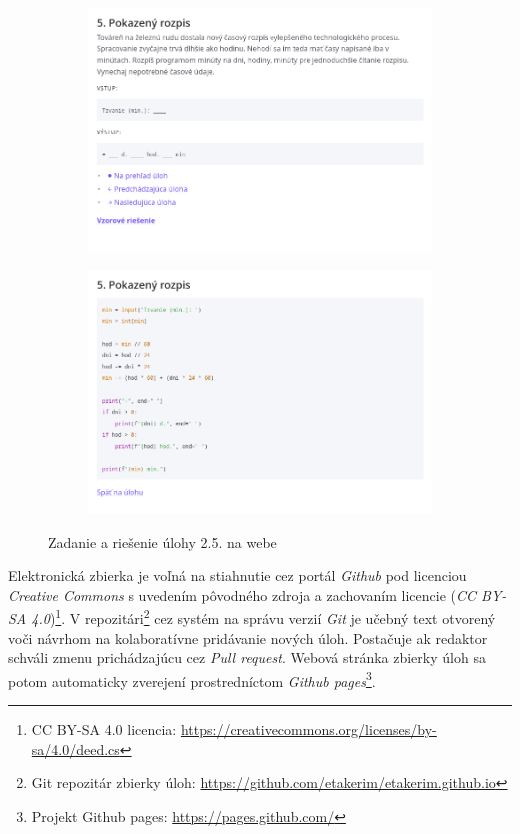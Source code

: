 \begin{figure}[h]
\centering
\begin{subfigure}[b]{0.49\textwidth}
\centering
\includegraphics[width=\textwidth]{assets/web-uloha.png}
\end{subfigure}
\hfill
\begin{subfigure}[b]{0.49\textwidth}
\centering
\includegraphics[width=\textwidth]{assets/web-riesenie.png}
\end{subfigure}
\caption{Zadanie a riešenie úlohy 2.5. na webe}
\label{fig:uloha-online}
\end{figure}

Elektronická zbierka je voľná na stiahnutie cez portál \emph{Github} pod licenciou \emph{Creative Commons} s uvedením pôvodného zdroja a zachovaním licencie (\emph{CC BY-SA 4.0})\footnote{CC BY-SA 4.0 licencia: \url{https://creativecommons.org/licenses/by-sa/4.0/deed.cs}}. V repozitári\footnote{Git repozitár zbierky úloh: \url{https://github.com/etakerim/etakerim.github.io}} cez systém na správu verzií \emph{Git} je učebný text otvorený voči návrhom na kolaboratívne pridávanie nových úloh. Postačuje ak redaktor schváli zmenu prichádzajúcu cez \emph{Pull request}. Webová stránka zbierky úloh sa potom automaticky zverejení prostredníctom \emph{Github pages}\footnote{Projekt Github pages: \url{https://pages.github.com/}}.

